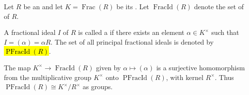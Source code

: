 \begin{definition} \label{definition:principal_fractional_ideal_of_an_integral_domain}
Let $R$ be an  and let $K = \operatorname{Frac}(R)$ be its . Let $\operatorname{FracId}(R)$ denote the set of  of $R$.

A fractional ideal $I$ of $R$ is called a  if there exists an element $\alpha \in K^\times$ such that $I = (\alpha) = \alpha R$. The set of all principal fractional ideals is denoted by \hl{$\operatorname{PFracId}(R)$}.

The map $K^\times \to \operatorname{FracId}(R)$ given by $\alpha \mapsto (\alpha)$ is a surjective homomorphism from the multiplicative group $K^\times$ onto $\operatorname{PFracId}(R)$, with kernel $R^\times$. Thus $\operatorname{PFracId}(R) \cong K^\times / R^\times$ as groups.
\end{definition}

